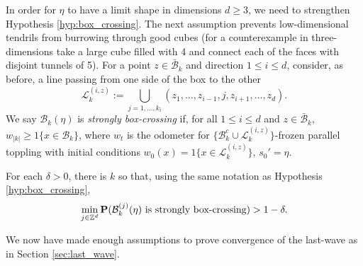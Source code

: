 \documentclass[12pt]{amsart}
\begin{document}
In order for $\eta$ to have a limit shape in dimensions $d \geq 3$, we need to strengthen 
Hypothesis \ref{hyp:box_crossing}. The next assumption prevents low-dimensional tendrils from burrowing through good cubes (for a counterexample in three-dimensions take a large cube filled with 4
and connect each of the faces with disjoint tunnels of 5). For a point $z \in \bar{\mathcal{B}}_k$ and direction $1 \leq i \leq d$, consider, as before, a line passing from one side of the box to the other 
\begin{equation}
\mathcal{L}_k^{(i,z)} := \bigcup_{j=1,\ldots,k_i} (z_1, \ldots, z_{i-1}, j, z_{i+1}, \ldots, z_d).
\end{equation}
We say $\mathcal{B}_k(\eta)$ is {\it strongly box-crossing} if, for all $1 \leq i \leq d$ and $z \in \bar{\mathcal{B}}_k$, $w_{|k|} \geq 1\{x \in \mathcal{B}_k \}$,
where $w_t$ is the odometer for $\{\mathcal{B}_k^c \cup \mathcal{L}_k^{(i,z)}\}$-frozen parallel toppling 
with initial conditions $w_0(x) = 1\{x \in \mathcal{L}_k^{(i,z)}\}$, $s_0' = \eta$.

\begin{hyp} \label{hyp:box_filling}
	For each $\delta > 0$, there is $k$ so that, using the same notation as Hypothesis \ref{hyp:box_crossing}, 
	\[
	\min_{j \in \mathbb{Z}^d} \mathbf{P}(\mathcal{B}^{(j)}_k(\eta) \mbox{ is strongly box-crossing}) > 1 - \delta.
	\]
\end{hyp}




We now have made enough assumptions to prove convergence of the last-wave as in Section \ref{sec:last_wave}. 
\end{document}
